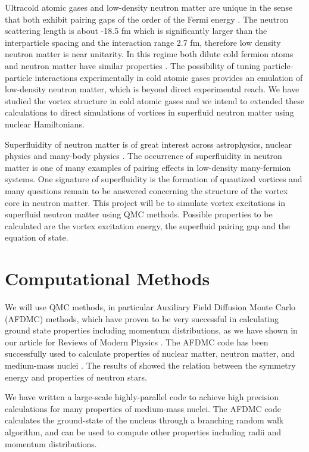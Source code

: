\documentclass[12pt,letterpaper]{article}
\begin{document}
Ultracold atomic gases and low-density neutron matter are unique in the 
sense that both exhibit pairing gaps of the order of the Fermi energy 
\cite{bro13}. The neutron scattering length is about -18.5 fm which is 
significantly larger than the interparticle spacing and the interaction 
range 2.7 fm, therefore low density neutron matter is near unitarity. In 
this regime both dilute cold fermion atoms and neutron matter have similar 
properties \cite{car12}. The possibility of tuning particle-particle 
interactions experimentally in cold atomic gases provides an emulation of 
low-density neutron matter, which is beyond direct experimental reach. We 
have studied the vortex structure in cold atomic gases \cite{mad15}
and we intend to extended these calculations to direct simulations of 
vortices in superfluid neutron matter using nuclear Hamiltonians.

Superfluidity of neutron matter is of great interest across astrophysics, 
nuclear physics and many-body physics \cite{gan09}. The occurrence of 
superfluidity in neutron matter is one of many examples of pairing effects 
in low-density many-fermion systems. One signature of superfluidity is the 
formation of quantized vortices and many questions remain to be answered 
concerning the structure of the vortex core in neutron matter. This project 
will be to simulate vortex excitations in superfluid neutron matter using 
QMC methods. Possible properties to be calculated are the vortex excitation 
energy, the superfluid pairing gap and the equation of state.

\section{Computational Methods}
\label{sec:comp_met}

We will use QMC methods, in particular Auxiliary Field Diffusion Monte Carlo 
(AFDMC) methods, which have proven to be very successful in calculating 
ground state properties including momentum distributions, as we have shown 
in our article for Reviews of Modern Physics \cite{car15}. The AFDMC code 
has been successfully used to calculate properties of nuclear matter, 
neutron matter, and medium-mass nuclei \cite{gan14}. The results of 
\cite{gan12} showed the relation between the symmetry energy and properties 
of neutron stars.

We have written a large-scale highly-parallel code to achieve high precision 
calculations for many properties of medium-mass nuclei. The AFDMC code 
calculates the
ground-state of the nucleus through a branching random walk algorithm, and 
can be used to compute other properties including radii and momentum 
distributions.
\end{document}
